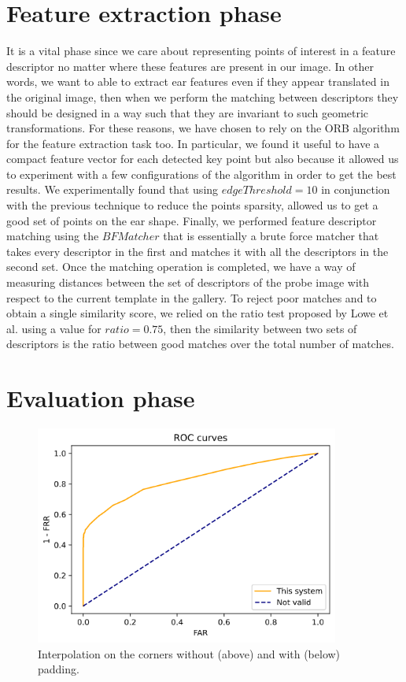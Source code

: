 \documentclass{article}
\begin{document}
\section{Feature extraction phase}

It is a vital phase since we care about representing points of interest in a feature descriptor no matter
where these features are present in our image. In other words, we want to able to extract ear features
even if they appear translated in the original image, then when we perform the matching between descriptors
they should be designed in a way such that they are invariant to such geometric transformations.
For these reasons, we have chosen to rely on the ORB algorithm for the feature extraction task too.
In particular, we found it useful to have a compact feature vector for each detected key point but also
because it allowed us to experiment with a few configurations of the algorithm in order to get the best
results. We experimentally found that using $edgeThreshold=10$ in conjunction with the previous technique
to reduce the points sparsity, allowed us to get a good set of points on the ear shape.
Finally, we performed feature descriptor matching using the $BFMatcher$ that is essentially a brute force
matcher that takes every descriptor in the first and matches it with all the descriptors in the second set.
Once the matching operation is completed, we have a way of measuring distances between the set of descriptors
of the probe image with respect to the current template in the gallery. To reject poor matches and to obtain
a single similarity score, we relied on the ratio test proposed by Lowe et al. \cite{Lowe:2004:DIF:993451.996342}
using a value for $ratio=0.75$, then the similarity between two sets of descriptors is the ratio between good
matches over the total number of matches.

\section{Evaluation phase}

\blindtext

\begin{figure}[H]
    \label{fig:roc}
    \begin{center}
        \includegraphics[width=10cm,keepaspectratio]{images/roc.png}
        \caption{Interpolation on the corners without (above) and with (below) padding.}
    \end{center}
\end{figure}
\end{document}
